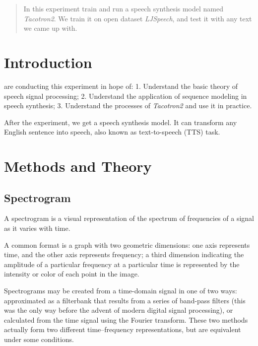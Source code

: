 \documentclass[journal, a4paper]{IEEEtran}
\begin{document}
\begin{abstract}
In this experiment train and run a speech synthesis model named \emph{Tacotron2}. We train it on open dataset \emph{LJSpeech}, and test it with any text we came up with.
\end{abstract}

\section{Introduction}

 are conducting this experiment in hope of:
1. Understand the basic theory of speech signal processing;
2. Understand the application of sequence modeling in speech synthesis;
3. Understand the processes of \emph{Tacotron2} and use it in practice.

After the experiment, we get a speech synthesis model. It can transform any English sentence into speech, also known as text-to-speech (TTS) task.

\section{Methods and Theory}

\subsection{Spectrogram}

A spectrogram is a visual representation of the spectrum of frequencies of a signal as it varies with time.

A common format is a graph with two geometric dimensions: one axis represents time, and the other axis represents frequency; a third dimension indicating the amplitude of a particular frequency at a particular time is represented by the intensity or color of each point in the image.

Spectrograms may be created from a time-domain signal in one of two ways: approximated as a filterbank that results from a series of band-pass filters (this was the only way before the advent of modern digital signal processing), or calculated from the time signal using the Fourier transform. These two methods actually form two different time–frequency representations, but are equivalent under some conditions.
\end{document}
